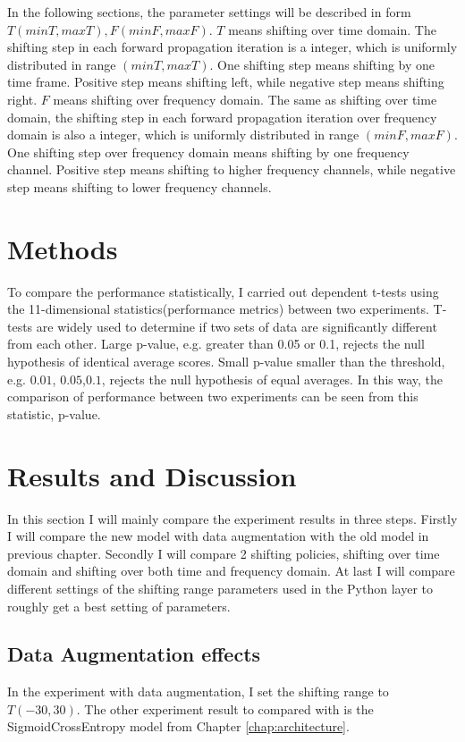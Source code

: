 In the following sections, the parameter settings will be described in form $T(minT,maxT),F(minF,maxF)$. $T$ means shifting over time domain. The shifting step in each forward propagation iteration is a integer, which is uniformly distributed in range $(minT,maxT)$. One shifting step means shifting by one time frame. Positive step means shifting left, while negative step means shifting right. $F$ means shifting over frequency domain. The same as shifting over time domain, the shifting step in each forward propagation iteration over frequency domain is also a integer, which is uniformly distributed in range $(minF,maxF)$. One shifting step over frequency domain means shifting by one frequency channel. Positive step means shifting to higher frequency channels, while negative step means shifting to lower frequency channels. 


\section{Methods}
To compare the performance statistically, I carried out dependent t-tests using the 11-dimensional statistics(performance metrics) between two experiments. T-tests are widely used to determine if two sets of data are significantly different from each other. Large p-value, e.g. greater than 0.05 or 0.1,  rejects the null hypothesis of identical average scores. Small p-value smaller than the threshold, e.g. $0.01$, $0.05$,$0.1$, rejects the null hypothesis of equal averages. In this way, the comparison of performance between two experiments can be seen from this statistic, p-value.
\section{Results and Discussion}
In this section I will mainly compare the experiment results in three steps. Firstly I will compare the new model with data augmentation with the old model in previous chapter. Secondly I will compare 2 shifting policies, shifting over time domain and shifting over both time and frequency domain. At last I will compare different settings of the shifting range parameters used in the Python layer to roughly get a best setting of parameters.
\subsection{Data Augmentation effects}
\label{subsec:dataaug}
In the experiment with data augmentation, I set the shifting range to $T(-30,30)$. The other experiment result to compared with is the SigmoidCrossEntropy model from Chapter \ref{chap:architecture}. 

